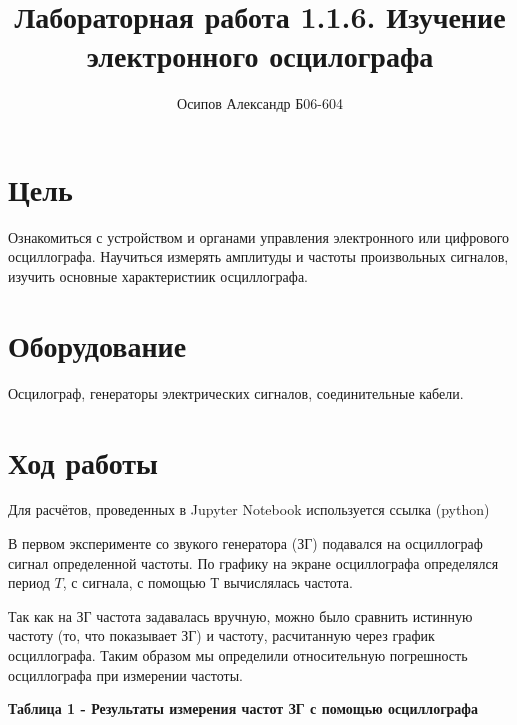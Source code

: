 \documentclass[12pt]{extarticle}
\begin{document}
\author{Осипов Александр Б06-604}
\title{Лабораторная работа 1.1.6. Изучение электронного осцилографа}
\maketitle
\section{Цель}

Ознакомиться с устройством и органами управления электронного или цифрового осциллографа.
Научиться измерять амплитуды и частоты произвольных сигналов, изучить основные характеристиик осциллографа.

\section{Оборудование}
Осцилограф, генераторы электрических сигналов, соединительные кабели.

\section{Ход работы}

Для расчётов, проведенных в Jupyter Notebook используется ссылка (python)

В первом эксперименте со звукого генератора (ЗГ) подавался на осциллограф сигнал определенной частоты.
По графику на экране осциллографа определялся период $T$, с сигнала, с помощью Т вычислялась частота.


Так как на ЗГ частота задавалась вручную, можно было сравнить истинную частоту (то, что показывает ЗГ) 
и частоту, расчитанную через график осциллографа. Таким образом мы определили относительную погрешность осциллографа при
измерении частоты. 

\vspace{5mm}

\textbf{\large Таблица 1 - Результаты измерения частот ЗГ с помощью осциллографа}

\begin{table}[H]
\end{table}
\end{document}
